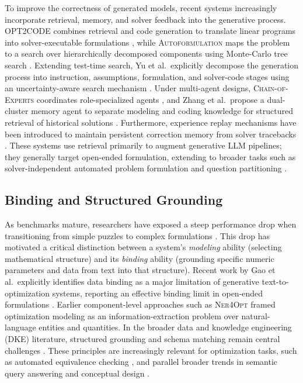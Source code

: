\documentclass[pdflatex,sn-basic,Numbered]{sn-jnl}
\begin{document}
To improve the correctness of generated models, recent systems increasingly incorporate retrieval, memory, and solver feedback into the generative process. \textsc{OPT2CODE} combines retrieval and code generation to translate linear programs into solver-executable formulations \cite{ahmed2025opt2code}, while \textsc{Autoformulation} maps the problem to a search over hierarchically decomposed components using Monte-Carlo tree search \cite{astorga2025autoformulation}. Extending test-time search, Yu et al.\ explicitly decompose the generation process into instruction, assumptions, formulation, and solver-code stages using an uncertainty-aware search mechanism \cite{yu2026uncertainty}. Under multi-agent designs, \textsc{Chain-of-Experts} coordinates role-specialized agents \cite{xiao2024chainofexperts}, and Zhang et al.\ propose a dual-cluster memory agent to separate modeling and coding knowledge for structured retrieval of historical solutions \cite{zhang2026dual}. Furthermore, experience replay mechanisms have been introduced to maintain persistent correction memory from solver tracebacks \cite{xie2026escaping}. These systems use retrieval primarily to augment generative LLM pipelines; they generally target open-ended formulation, extending to broader tasks such as solver-independent automated problem formulation \cite{li2026solver} and question partitioning \cite{pan2025pamop}.

\subsection{Binding and Structured Grounding}
\label{subsec:rw_binding}

As benchmarks mature, researchers have exposed a steep performance drop when transitioning from simple puzzles to complex formulations \cite{miplibnl2026}. This drop has motivated a critical distinction between a system's \emph{modeling} ability (selecting mathematical structure) and its \emph{binding} ability (grounding specific numeric parameters and data from text into that structure). Recent work by Gao et al.\ explicitly identifies data binding as a major limitation of generative text-to-optimization systems, reporting an effective binding limit in open-ended formulations \cite{gao2026models}. Earlier component-level approaches such as \textsc{Ner4Opt} \cite{kadioglu2024ner4opt} framed optimization modeling as an information-extraction problem over natural-language entities and quantities. In the broader data and knowledge engineering (DKE) literature, structured grounding and schema matching remain central challenges \cite{yu2018spider,affolter2019nli,sheetrit2024rematch}. These principles are increasingly relevant for optimization tasks, such as automated equivalence checking \cite{zhai2025equivamap}, and parallel broader trends in semantic query answering and conceptual design \cite{rizzi2025conceptual,atzeni2026semantic}.
\end{document}
